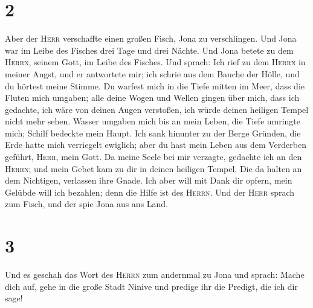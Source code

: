 \hypertarget{section-1}{%
\section{2}\label{section-1}}

 Aber der \textsc{Herr} verschaffte einen großen Fisch,
Jona zu verschlingen. Und Jona war im Leibe des Fisches drei Tage und
drei Nächte.  Und Jona betete zu dem \textsc{Herrn},
seinem Gott, im Leibe des Fisches.  Und sprach: Ich rief
zu dem \textsc{Herrn} in meiner Angst, und er antwortete mir; ich schrie
aus dem Bauche der Hölle, und du hörtest meine Stimme.  Du
warfest mich in die Tiefe mitten im Meer, dass die Fluten mich umgaben;
alle deine Wogen und Wellen gingen über mich,  dass ich
gedachte, ich wäre von deinen Augen verstoßen, ich würde deinen heiligen
Tempel nicht mehr sehen.  Wasser umgaben mich bis an mein
Leben, die Tiefe umringte mich; Schilf bedeckte mein Haupt.
 Ich sank hinunter zu der Berge Gründen, die Erde hatte
mich verriegelt ewiglich; aber du hast mein Leben aus dem Verderben
geführt, \textsc{Herr}, mein Gott.  Da meine Seele bei mir
verzagte, gedachte ich an den \textsc{Herrn}; und mein Gebet kam zu dir
in deinen heiligen Tempel.  Die da halten an dem
Nichtigen, verlassen ihre Gnade.  Ich aber will mit Dank
dir opfern, mein Gelübde will ich bezahlen; denn die Hilfe ist des
\textsc{Herrn}.  Und der \textsc{Herr} sprach zum Fisch,
und der spie Jona aus ans Land.

\hypertarget{section-2}{%
\section{3}\label{section-2}}

 Und es geschah das Wort des \textsc{Herrn} zum andernmal
zu Jona und sprach:  Mache dich auf, gehe in die große
Stadt Ninive und predige ihr die Predigt, die ich dir sage!

